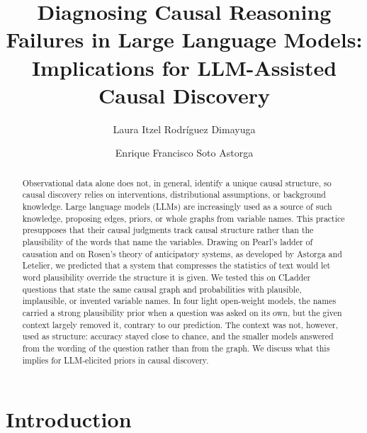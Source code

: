 \documentclass{llncs}
\begin{document}
%
\title{Diagnosing Causal Reasoning Failures in Large Language Models: Implications for LLM-Assisted Causal Discovery}
%
%
\author{Laura Itzel Rodríguez Dimayuga \and Enrique Francisco Soto Astorga}
%
%
%
\maketitle
%
\begin{abstract}
Observational data alone does not, in general, identify a unique causal structure, so causal discovery relies on interventions, distributional assumptions, or background knowledge. Large language models (LLMs) are increasingly used as a source of such knowledge, proposing edges, priors, or whole graphs from variable names. This practice presupposes that their causal judgments track causal structure rather than the plausibility of the words that name the variables. Drawing on Pearl's ladder of causation and on Rosen's theory of anticipatory systems, as developed by Astorga and Letelier, we predicted that a system that compresses the statistics of text would let word plausibility override the structure it is given. We tested this on CLadder questions that state the same causal graph and probabilities with plausible, implausible, or invented variable names. In four light open-weight models, the names carried a strong plausibility prior when a question was asked on its own, but the given context largely removed it, contrary to our prediction. The context was not, however, used as structure: accuracy stayed close to chance, and the smaller models answered from the wording of the question rather than from the graph. We discuss what this implies for LLM-elicited priors in causal discovery.

\end{abstract}
%
\section{Introduction}
\label{sec:intro}
\end{document}
